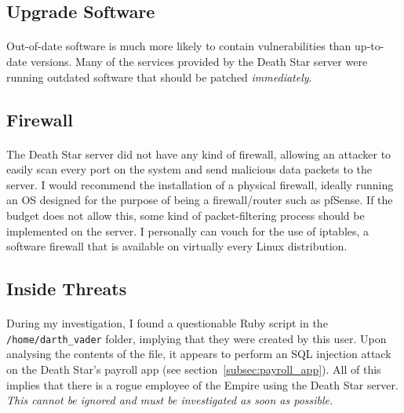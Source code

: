 \documentclass{article}
\begin{document}
\subsection{Upgrade Software}
\label{subsec:upgrade_software}
\paragraph{}
Out-of-date software is much more likely to contain vulnerabilities than up-to-date versions.
Many of the services provided by the Death Star server were running outdated software that should be patched \emph{immediately}.

\subsection{Firewall}
\label{subsec:firewall}
\paragraph{}
The Death Star server did not have any kind of firewall, allowing an attacker to easily scan every port on the system and send malicious data packets to the server.
I would recommend the installation of a physical firewall, ideally running an OS designed for the purpose of being a firewall/router such as pfSense.
If the budget does not allow this, some kind of packet-filtering process should be implemented on the server.
I personally can vouch for the use of iptables, a software firewall that is available on virtually every Linux distribution. 

\subsection{Inside Threats}
\label{subsec:inside_threats}
\paragraph{}
During my investigation, I found a questionable Ruby script in the \texttt{/home/darth\_vader} folder, implying that they were created by this user.
Upon analysing the contents of the file, it appears to perform an SQL injection attack on the Death Star's payroll app (see section~\ref{subsec:payroll_app}).
All of this implies that there is a rogue employee of the Empire using the Death Star server.
\emph{This cannot be ignored and must be investigated as soon as possible.} 
\end{document}
